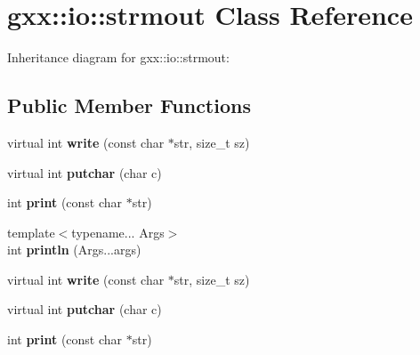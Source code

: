 \hypertarget{classgxx_1_1io_1_1strmout}{}\section{gxx\+:\+:io\+:\+:strmout Class Reference}
\label{classgxx_1_1io_1_1strmout}


Inheritance diagram for gxx\+:\+:io\+:\+:strmout\+:
\subsection*{Public Member Functions}
\begin{DoxyCompactItemize}
\item 
virtual int {\bfseries write} (const char $\ast$str, size\+\_\+t sz)\hypertarget{classgxx_1_1io_1_1strmout_abb1fc1d2780138a4d176ef25b1742b0d}{}\label{classgxx_1_1io_1_1strmout_abb1fc1d2780138a4d176ef25b1742b0d}

\item 
virtual int {\bfseries putchar} (char c)\hypertarget{classgxx_1_1io_1_1strmout_ac933aaaa835edf900a35d2affaeede7c}{}\label{classgxx_1_1io_1_1strmout_ac933aaaa835edf900a35d2affaeede7c}

\item 
int {\bfseries print} (const char $\ast$str)\hypertarget{classgxx_1_1io_1_1strmout_a2a57b1ead8397800021d17250b5022ca}{}\label{classgxx_1_1io_1_1strmout_a2a57b1ead8397800021d17250b5022ca}

\item 
{\footnotesize template$<$typename... Args$>$ }\\int {\bfseries println} (Args...\+args)\hypertarget{classgxx_1_1io_1_1strmout_a14338a75a3d625b1b548f03d93b0f5dd}{}\label{classgxx_1_1io_1_1strmout_a14338a75a3d625b1b548f03d93b0f5dd}

\item 
virtual int {\bfseries write} (const char $\ast$str, size\+\_\+t sz)\hypertarget{classgxx_1_1io_1_1strmout_abb1fc1d2780138a4d176ef25b1742b0d}{}\label{classgxx_1_1io_1_1strmout_abb1fc1d2780138a4d176ef25b1742b0d}

\item 
virtual int {\bfseries putchar} (char c)\hypertarget{classgxx_1_1io_1_1strmout_ac933aaaa835edf900a35d2affaeede7c}{}\label{classgxx_1_1io_1_1strmout_ac933aaaa835edf900a35d2affaeede7c}

\item 
int {\bfseries print} (const char $\ast$str)\hypertarget{classgxx_1_1io_1_1strmout_a2a57b1ead8397800021d17250b5022ca}{}\label{classgxx_1_1io_1_1strmout_a2a57b1ead8397800021d17250b5022ca}


\end{DoxyCompactItemize}
